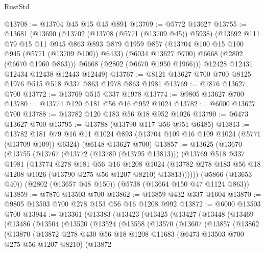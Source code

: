 \begin{lexlean}{RustStd}
\begin{coremodule}
@13708 := @13704 @45 @15 @45 @891
@13709 := @5772 @13627
@13755 := @13681
    (@13690
      (@13702
        (@13708 (@5771 (@13709 @45)) @5938)
        (@13692
          @111
          @79
          @15
          @11
          @945
          @863
          @893
          @879
          @1959
          @857
          (@13704 @100 @15 @100 @945 (@5771 (@13709 @100)) @6433)
          (@6034 @13627 @700)
          @6668
          (@2802 (@6670 @1960 @863)))
        @6668
        (@2802 (@6670 @1950 @1966)))
      @12428
      @12431
      @12434
      @12438
      @12443
      @12449)
@13767 := @8121 @13627 @700 @700 @8125 @1976 @515 @518 @337 @863 @1978 @863 @1981
@13769 := @7876 @13627 @700
@13772 := @13769 @515 @337 @1978
@13774 := @9805 @13627 @700
@13780 := @13774 @120 @181 @56 @16 @952 @1024
@13782 := @6000 @13627 @700
@13788 := @13782 @120 @183 @56 @18 @952 @1026
@13790 := @6473 @13627 @700
@13795 := @13788 (@13790 @117 @56 @951 @6485)
@13813 := @13782
    @181
    @79
    @16
    @11
    @1024
    @893
    (@13704 @109 @16 @109 @1024 (@5771 (@13709 @109)) @6324)
    (@6148 @13627 @700)
@13857 := @13625
    (@13670
      (@13755
        (@13767
          (@13772 (@13780 (@13795 @13813)))
          (@13769
            @518
            @337
            @1981
            (@13774
              @278
              @181
              @56
              @16
              @1208
              @1024
              (@13782 @278 @183 @56 @18 @1208 @1026 (@13790 @275 @56 @1207 @8210) @13813))))))
    (@5866 (@13653 @40))
    (@2802 (@13657 @48 @150))
    (@5738 (@13664 @150 @47 @1124 @863))
@13859 := @7876 @13503 @700
@13862 := @13859 @432 @337 @1604
@13870 := @9805 @13503 @700 @278 @153 @56 @16 @1208 @992
@13872 := @6000 @13503 @700
@13944 := @13361
    (@13383
      (@13423
        (@13425
          (@13427
            (@13448
              (@13469
                (@13486
                  (@13504
                    (@13520
                      (@13524
                        (@13558
                          (@13570
                            (@13607
                              (@13857
                                (@13862
                                  (@13870
                                    (@13872
                                      @278
                                      @430
                                      @56
                                      @18
                                      @1208
                                      @11683
                                      (@6473 @13503 @700 @275 @56 @1207 @8210)
                                      (@13872

\end{coremodule}
\end{lexlean}
